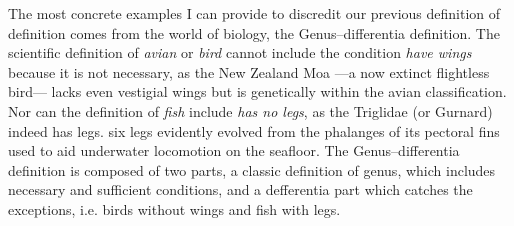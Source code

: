 The most concrete examples I can provide to discredit our previous definition of definition comes from the world of biology, the Genus–differentia definition. The scientific definition of \textit{avian} or \textit{bird} cannot include the condition \textit{have wings} because it is not necessary, as the New Zealand Moa ---a now extinct flightless bird--- lacks even vestigial wings but is genetically within the avian classification. Nor can the definition of \textit{fish} include \textit{has no legs}, as the Triglidae (or Gurnard) indeed has legs. six legs evidently evolved from the phalanges of its pectoral fins used to aid underwater locomotion on the seafloor. The Genus–differentia definition is composed of two parts, a classic definition of genus, which includes necessary and sufficient conditions, and a defferentia part which catches the exceptions, i.e. birds without wings and fish with legs.




